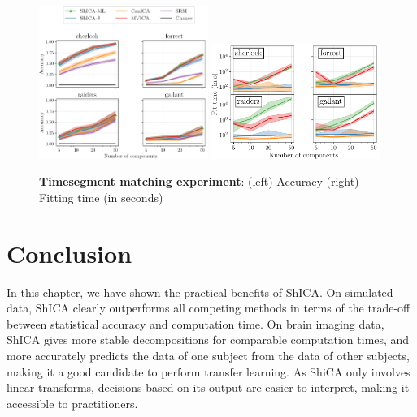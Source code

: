 \begin{figure}
    \centering
    \includegraphics[width=0.49\textwidth]{./figures/amvica/timesegment_matching.pdf}
    \includegraphics[width=0.49\textwidth]{./figures/amvica/timesegment_matching_timings.pdf}
    \caption{\textbf{Timesegment matching experiment}: (left) Accuracy (right) Fitting time (in seconds)}
    \label{exp:timesegment}
\end{figure}


% 


\section{Conclusion}
In this chapter, we have shown the practical benefits of ShICA.
On simulated data, ShICA clearly outperforms all competing methods in terms of the trade-off between statistical accuracy and computation time. On brain imaging data, ShICA gives more stable decompositions for comparable computation times, and more accurately predicts the data of one subject from the data of other subjects, making it a good candidate to perform transfer learning.
As ShiCA only involves linear transforms, decisions based on its output are easier to interpret, making it accessible to practitioners.

